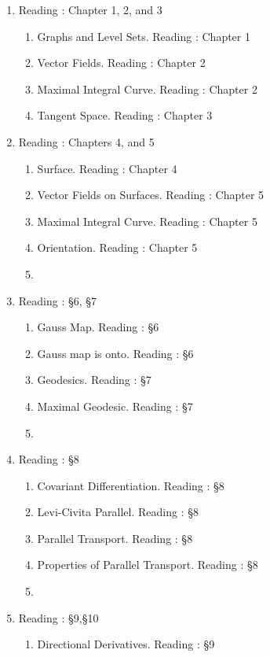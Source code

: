 \begin{enumerate}[label=Week \arabic*]
	\item Reading : Chapter 1, 2, and 3
	\begin{enumerate}[label=Day \arabic*]
		\item Graphs and Level Sets. Reading : Chapter 1
		\item Vector Fields. Reading : Chapter 2
		\item Maximal Integral Curve. Reading : Chapter 2
		\item Tangent Space. Reading : Chapter 3
	\end{enumerate}
	\item Reading : Chapters 4, and 5
	\begin{enumerate}[label=Day \arabic*]
		\item Surface. Reading : Chapter 4
		\item Vector Fields on Surfaces. Reading : Chapter 5
		\item Maximal Integral Curve. Reading : Chapter 5
		\item Orientation. Reading : Chapter 5
		\item
	\end{enumerate}
	\item Reading : \S6, \S7
	\begin{enumerate}[label=Day \arabic*]
		\item Gauss Map. Reading : \S6
		\item Gauss map is onto. Reading : \S6
		\item Geodesics. Reading : \S7
		\item Maximal Geodesic. Reading : \S7
		\item
	\end{enumerate}
	\item Reading : \S8
	\begin{enumerate}[label=Day \arabic*]
		\item Covariant Differentiation. Reading : \S8
		\item Levi-Civita Parallel. Reading : \S8
		\item Parallel Transport. Reading : \S8
		\item Properties of Parallel Transport. Reading : \S8
		\item
	\end{enumerate}
	\item Reading : \S9,\S10
	\begin{enumerate}[label=Day \arabic*]
		\item Directional Derivatives. Reading : \S9

\end{enumerate}
\end{enumerate}
